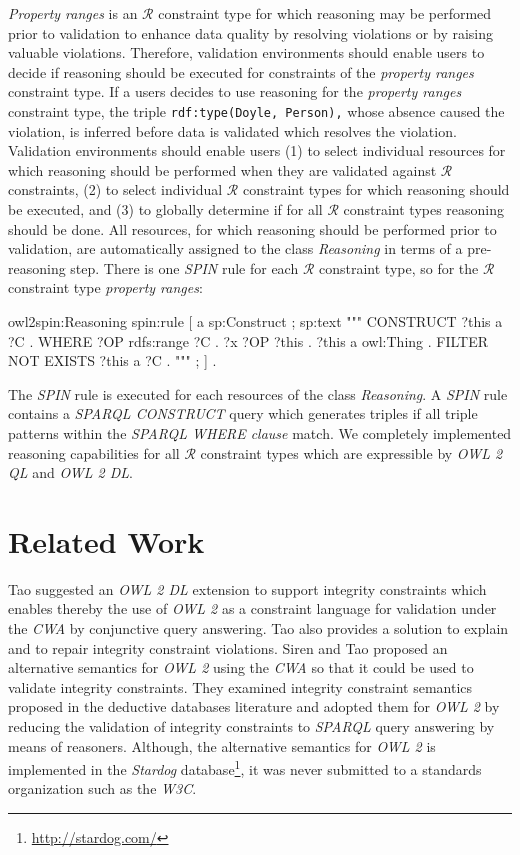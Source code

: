 \documentclass{acm_proc_article-sp}
\newcommand{\ms}[1]{%
  \texttt{#1}
}
\begin{document}
\emph{Property ranges} is an $\mathcal{R}$ constraint type 
for which reasoning may be performed prior to validation to enhance data quality by resolving violations or by raising valuable violations.
Therefore, validation environments should enable users to decide if reasoning should be executed for constraints of the \emph{property ranges} constraint type. 
If a users decides to use reasoning for the \emph{property ranges} constraint type, 
the triple {\small\ms{rdf:type(Doyle, Person),}} whose absence caused the violation, is inferred before data is validated which resolves the violation. 
Validation environments should enable users
(1) to select individual resources for which reasoning should be performed when they are validated against $\mathcal{R}$ constraints,
(2) to select individual $\mathcal{R}$ constraint types for which reasoning should be executed, and
(3) to globally determine if for all $\mathcal{R}$ constraint types reasoning should be done. 
All resources, for which reasoning should be performed prior to validation, are automatically assigned to the class \emph{Reasoning} in terms of a pre-reasoning step.
There is one \emph{SPIN} rule for each $\mathcal{R}$ constraint type, so for the $\mathcal{R}$ constraint type \emph{property ranges}:

\begin{ex}
owl2spin:Reasoning spin:rule [ a sp:Construct ; sp:text """
  CONSTRUCT { ?this a ?C . }
  WHERE { ?OP rdfs:range ?C . ?x ?OP ?this . ?this a owl:Thing .
  FILTER NOT EXISTS { ?this a ?C } . } """ ; ] .	
\end{ex}

The \emph{SPIN} rule is executed for each resources of the class \emph{Reasoning}.
A \emph{SPIN} rule contains a \emph{SPARQL CONSTRUCT} query which generates triples 
if all triple patterns within the \emph{SPARQL WHERE clause} match.
We completely implemented reasoning capabilities for all $\mathcal{R}$ constraint types which are expressible by \emph{OWL 2 QL} and \emph{OWL 2 DL}. 

\section{Related Work}
\label{sec:related-Work}

Tao \cite{tao2012integrity} suggested an \emph{OWL 2 DL} extension to support integrity constraints 
which enables thereby the use of \emph{OWL 2} as a constraint language for validation under the \emph{CWA} by conjunctive query answering. 
Tao also provides a solution to explain and to repair integrity constraint violations.
Siren and Tao \cite{SirinTao2009} proposed an alternative semantics for \emph{OWL 2} using the \emph{CWA} 
so that it could be used to validate integrity constraints.
They examined integrity constraint semantics proposed in the deductive databases literature and adopted them for \emph{OWL 2}
by reducing the validation of integrity constraints to \emph{SPARQL} query answering by means of reasoners.
Although, the alternative semantics for \emph{OWL 2} is implemented in the \emph{Stardog} database\footnote{\url{http://stardog.com/}}, it was never submitted to a standards organization such as the \emph{W3C}.
\end{document}
